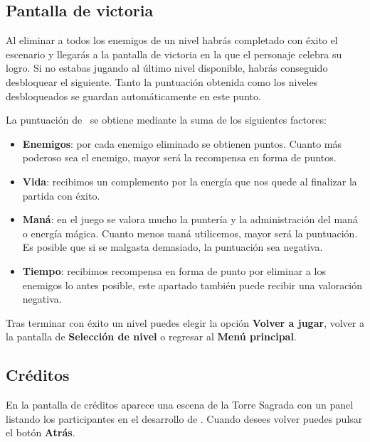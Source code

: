 \subsection*{Pantalla de victoria}

Al eliminar a todos los enemigos de un nivel habrás completado con éxito
el escenario y llegarás a la pantalla de victoria en la que el personaje
celebra su logro. Si no estabas jugando al último nivel disponible, 
habrás conseguido desbloquear el siguiente. Tanto la puntuación obtenida
como los niveles desbloqueados se guardan automáticamente en este punto.


La puntuación de \juego\ se obtiene mediante la suma de los siguientes
factores:

\begin{itemize}
    \itemsep0em
    \item \textbf{Enemigos}: por cada enemigo eliminado se obtienen puntos.
    Cuanto más poderoso sea el enemigo, mayor será la recompensa en forma de puntos.
    \item \textbf{Vida}: recibimos un complemento por la energía que nos quede
    al finalizar la partida con éxito.
    \item \textbf{Maná}: en el juego se valora mucho la puntería y la administración
    del maná o energía mágica. Cuanto menos maná utilicemos, mayor será la puntuación.
    Es posible que si se malgasta demasiado, la puntuación sea negativa.
    \item \textbf{Tiempo}: recibimos recompensa en forma de punto por
    eliminar a los enemigos lo antes posible, este apartado también puede
    recibir una valoración negativa.
\end{itemize}

Tras terminar con éxito un nivel puedes elegir la opción \textbf{Volver a jugar},
volver a la pantalla de \textbf{Selección de nivel} o regresar al \textbf{Menú principal}.

\subsection*{Créditos}

En la pantalla de créditos aparece una escena de la Torre Sagrada con
un panel listando los participantes en el desarrollo de \juego. Cuando
desees volver puedes pulsar el botón \textbf{Atrás}.

